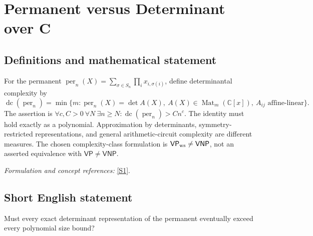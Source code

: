 \documentclass[11pt,a4paper]{article}
\newcommand{\C}{\mathbb{C}}
\newcommand{\sref}[2]{\hyperlink{source:#1:#2}{[S#2]}}
\newif\ifshowcatalogue
\newcommand{\cataloguescope}[1]{\ifshowcatalogue
 \paragraph{Exact scope in the supplied catalogue.}
 \begin{quote}\small #1\end{quote}\fi}
\numberwithin{equation}{section}
\begin{document}
\setcounter{section}{0}
\clearpage
\section*{\texorpdfstring{Permanent versus Determinant over C}{Permanent versus Determinant over C}}\label{30006699}
\subsection{Definitions and mathematical statement}
For the permanent $\operatorname{per}_n(X)=\sum_{\sigma\in S_n}\prod_i x_{i,\sigma(i)}$, define determinantal complexity by
\[
 \operatorname{dc}(\operatorname{per}_n)=\min\{m:\operatorname{per}_n(X)=\det A(X),\
 A(X)\in\operatorname{Mat}_m(\C[x]),\ A_{ij}\text{ affine-linear}\}.
\]
The assertion is $\forall c,C>0\ \forall N\ \exists n\ge N:\operatorname{dc}(\operatorname{per}_n)>Cn^c$. The identity must hold exactly as a polynomial. Approximation by determinants, symmetry-restricted representations, and general arithmetic-circuit complexity are different measures. The chosen complexity-class formulation is $\mathsf{VP}_{\rm ws}\ne\mathsf{VNP}$, not an asserted equivalence with $\mathsf{VP}\ne\mathsf{VNP}$.
\par\smallskip\textit{Formulation and concept references:} \sref{30006699}{1}.
\cataloguescope{Over C, let dc(per\_n) be the least m for which the n\ensuremath{\times}n permanent per\_n(X) equals the determinant of an m\ensuremath{\times}m matrix whose entries are affine-linear forms in the n\textasciicircum{}2 variables X, as an exact polynomial identity. Assert that dc(per\_n) is not O(n\textasciicircum{}c) for any real constant c>0: explicitly, for every c>0, C>0 and integer N\ensuremath{\ge}1, some n\ensuremath{\ge}N satisfies dc(per\_n)>C*n\textasciicircum{}c. No restrictions of equivariance, sparsity or symmetry are imposed on the representing matrix. This is exact, not border, determinantal complexity over C; the selected assertion is the source’s VP\_ws != VNP formulation, not an assertion that it is equivalent to VP != VNP.}
\subsection{Short English statement}
Must every exact determinant representation of the permanent eventually exceed every polynomial size bound?
\end{document}
